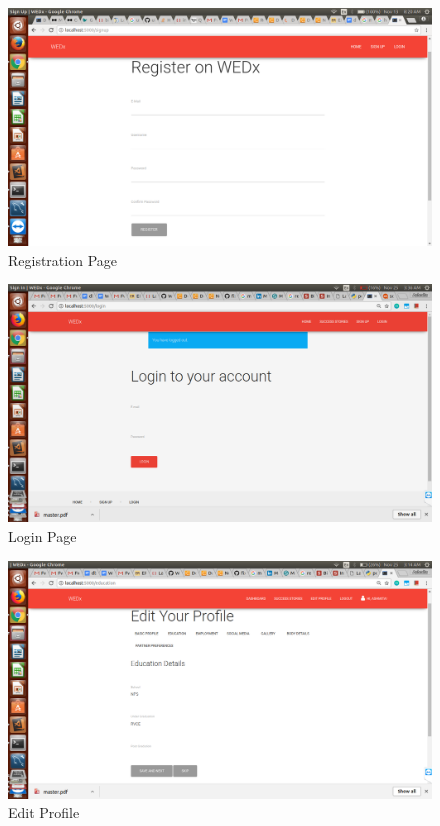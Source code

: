 \documentclass[12pt]{report}
\begin{document}
\begin{figure}[!htb]
    \centering
    \includegraphics[width=1\textwidth]{sc-2.png}
    \caption{Registration Page}
    \label{fig:Registration Page}
\end{figure}


\begin{figure}[!htb]
    \centering
    \includegraphics[width=1\textwidth]{sc-25.png}
    \caption{Login Page}
    \label{fig:Login Page}
\end{figure}


\begin{figure}[!htb]
    \centering
    \includegraphics[width=1\textwidth]{sc-3.png}
    \caption{Edit Profile}
    \label{fig:Edit Profile}
\end{figure}
\end{document}
